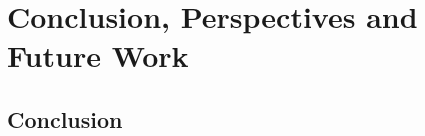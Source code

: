 
\chapter{Conclusion, Perspectives and Future Work} %

\label{Chapter6} %




\section{Conclusion}

